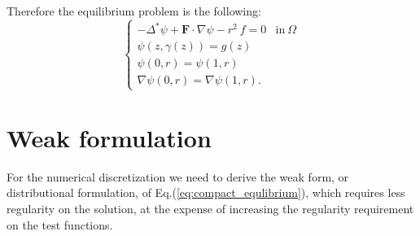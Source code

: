 Therefore the equilibrium problem is the following:
\begin{equation}\label{eq:equlibrium_and_bc}
  \begin{cases}
    -\Delta^*\psi+\mathbf{F}\cdot\nabla\psi-r^2\:f=0 & \mathrm{in}\:\Omega\\
    \psi(z,\gamma(z))=g(z)& \\
    \psi(0,r)=\psi(1,r)\\
    \nabla\psi(0,r)=\nabla\psi(1,r).
  \end{cases}
\end{equation}

\section{Weak formulation}\label{sec:weak_formulation}
For the numerical discretization we need to derive the weak form, or distributional formulation, of Eq.(\ref{eq:compact_equlibrium}), which requires less regularity on the solution, at the expense of increasing the regularity requirement on the test functions.
\medskip

